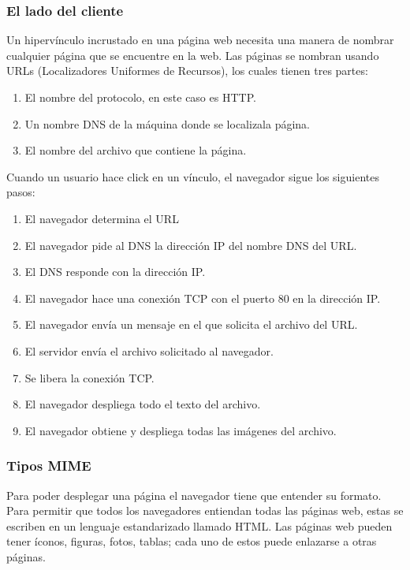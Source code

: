 \documentclass[10pt,a4paper]{report}
\begin{document}
			\subsubsection{El lado del cliente}
						
				\par Un hipervínculo incrustado en una página web necesita una manera de nombrar cualquier página que se encuentre en la web. Las páginas se nombran usando URLs (Localizadores Uniformes de Recursos), los cuales tienen tres partes:

				\begin{enumerate}
					\item El nombre del protocolo, en este caso es HTTP.
					\item Un nombre DNS de la máquina donde se localizala página.
					\item El nombre del archivo que contiene la página.
				\end{enumerate}

			\par Cuando un usuario hace click en un vínculo, el navegador sigue los siguientes pasos:
				\begin{enumerate}
					\item El navegador determina el URL
					\item El navegador pide al DNS la dirección IP del nombre DNS del URL.
					\item El DNS responde con la dirección IP.
					\item El navegador hace una conexión TCP con el puerto 80 en la dirección IP.
					\item El navegador envía un mensaje en el que solicita el archivo del URL.
					\item El servidor envía el archivo solicitado al navegador.
					\item Se libera la conexión TCP.
					\item El navegador despliega todo el texto del archivo.
					\item El navegador obtiene y despliega todas las imágenes del archivo.
				\end{enumerate}

			\subsubsection{Tipos MIME}

				\par Para poder desplegar una página el navegador tiene que entender su formato. Para permitir que todos los navegadores entiendan todas las páginas web, estas se escriben en un lenguaje estandarizado llamado HTML. Las páginas web pueden tener íconos, figuras, fotos, tablas; cada uno de estos puede enlazarse a otras páginas.
\end{document}
